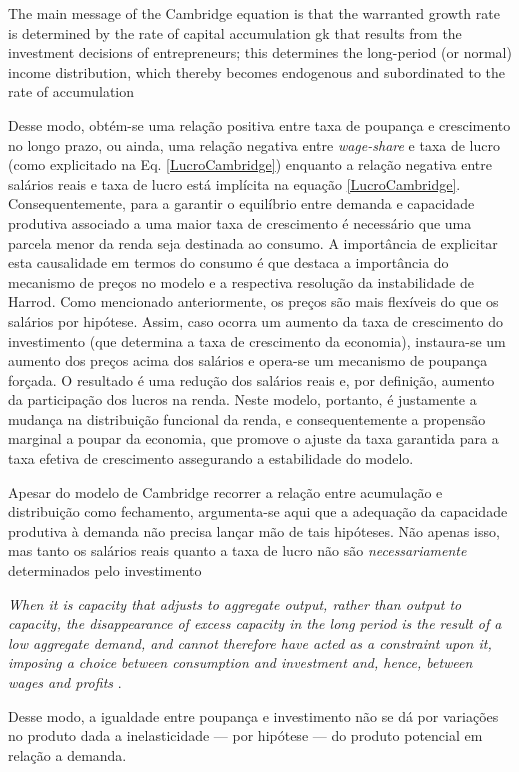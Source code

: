 \begin{citacao}
The main message of the Cambridge
equation is that the warranted growth rate is determined by the rate of capital
accumulation gk that results from the investment decisions of entrepreneurs; this
determines the long-period (or normal) income distribution, which thereby
becomes endogenous and subordinated to the rate of accumulation \cite[p.~158]{cesaratto_neo-kaleckian_2015}
\end{citacao}
Desse modo, obtém-se uma relação positiva entre taxa de poupança e crescimento no longo prazo, ou ainda, uma relação negativa entre \textit{wage-share} e taxa de lucro (como explicitado na Eq. \ref{LucroCambridge}) enquanto a relação negativa entre salários reais e taxa de lucro está implícita na equação \ref{LucroCambridge}. Consequentemente, para a garantir o equilíbrio entre demanda e capacidade produtiva associado a uma maior taxa de crescimento é necessário que uma parcela menor da renda seja destinada ao consumo. A importância de explicitar esta causalidade em termos do consumo é que destaca a importância do mecanismo de preços no modelo e a respectiva resolução da instabilidade de Harrod. Como mencionado anteriormente, os preços são mais flexíveis do que os salários por hipótese. Assim, caso ocorra um aumento da taxa de crescimento do investimento (que determina a taxa de crescimento da economia), instaura-se um aumento dos preços acima dos salários e opera-se um mecanismo de poupança forçada. O resultado é uma redução dos salários reais e, por definição, aumento da participação dos lucros na renda.  Neste modelo, portanto, é justamente a mudança na distribuição funcional da renda, e consequentemente a propensão marginal a poupar da economia, que promove o ajuste da taxa garantida para a taxa efetiva de crescimento assegurando a estabilidade do modelo.

Apesar do modelo de Cambridge recorrer a relação entre acumulação e distribuição como fechamento, argumenta-se aqui que a adequação da capacidade
produtiva à demanda não precisa lançar mão de tais hipóteses.
Não apenas isso, mas tanto os salários reais quanto a taxa de lucro não são \textit{necessariamente} determinados pelo investimento

\begin{citacao}
\textit{When it is
capacity that adjusts to aggregate output, rather than output to
capacity, the disappearance of excess capacity in the long period is
the result of a low aggregate demand, and cannot therefore have
acted as a constraint upon it, imposing a choice between consumption
and investment and, hence, between wages and profits} \cite[p.~50]{halevi_notes_2014}.
\end{citacao}
Desse modo, a igualdade entre poupança e investimento não se dá por variações no produto dada a inelasticidade --- por hipótese --- do produto potencial em relação a demanda.

